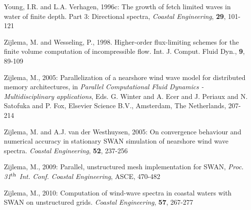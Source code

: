 \documentclass[12pt]{book}
\begin{document}
\begin{thebibliography}{10}
Young, I.R. and L.A. Verhagen, 1996c: The growth of fetch limited waves in water of finite depth. Part 3:
Directional spectra, {\it Coastal Engineering}, {\bf 29}, 101-121

Zijlema, M. and Wesseling, P., 1998. Higher-order flux-limiting schemes for the finite volume
  computation of incompressible flow. Int. J. Comput. Fluid Dyn., {\bf 9}, 89-109

Zijlema, M., 2005: Parallelization of a nearshore wind wave model for distributed memory architectures,
in {\it Parallel Computational Fluid Dynamics - {M}ultidisciplinary applications},
Eds. G. Winter and A. Ecer and J. Periaux and N. Satofuka and P. Fox,
Elsevier Science B.V., Amsterdam, The Netherlands, 207-214

Zijlema, M. and A.J. van der Westhuysen, 2005: On convergence behaviour and numerical accuracy in stationary
SWAN simulation of nearshore wind wave spectra. {\it Coastal Engineering}, {\bf 52}, 237-256

Zijlema, M., 2009: Parallel, unstructured mesh implementation for SWAN,
{\it Proc. 31$^{{\rm th}}$ Int. Conf. Coastal Engineering}, ASCE, 470-482

Zijlema, M., 2010: Computation of wind-wave spectra in coastal waters with SWAN on unstructured grids.
{\it Coastal Engineering}, {\bf 57}, 267-277

\end{thebibliography}
\end{document}
